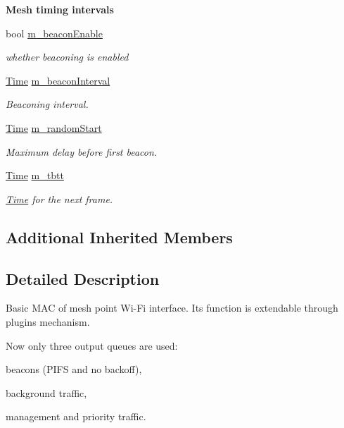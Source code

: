 \begin{Indent}{\bf Mesh timing intervals}\par
\begin{DoxyCompactItemize}
\item 
bool \hyperlink{classns3_1_1MeshWifiInterfaceMac_ab9019c324f1c01c06ce13bc137691c39}{m\+\_\+beacon\+Enable}
\begin{DoxyCompactList}\small\item\em whether beaconing is enabled \end{DoxyCompactList}\item 
\hyperlink{classns3_1_1Time}{Time} \hyperlink{classns3_1_1MeshWifiInterfaceMac_a106e67903abbdb360b51ce457b6d315b}{m\+\_\+beacon\+Interval}
\begin{DoxyCompactList}\small\item\em Beaconing interval. \end{DoxyCompactList}\item 
\hyperlink{classns3_1_1Time}{Time} \hyperlink{classns3_1_1MeshWifiInterfaceMac_ac5bcacc9a26b26fade1fd72e980ebd68}{m\+\_\+random\+Start}
\begin{DoxyCompactList}\small\item\em Maximum delay before first beacon. \end{DoxyCompactList}\item 
\hyperlink{classns3_1_1Time}{Time} \hyperlink{classns3_1_1MeshWifiInterfaceMac_af979a6faf2261a0bde9ebb5cdcb15450}{m\+\_\+tbtt}
\begin{DoxyCompactList}\small\item\em \hyperlink{classns3_1_1Time}{Time} for the next frame. \end{DoxyCompactList}\end{DoxyCompactItemize}
\end{Indent}
\subsection*{Additional Inherited Members}


\subsection{Detailed Description}
Basic M\+AC of mesh point Wi-\/\+Fi interface. Its function is extendable through plugins mechanism. 

Now only three output queues are used\+:
\begin{DoxyItemize}
\item beacons (P\+I\+FS and no backoff),
\item background traffic,
\item management and priority traffic. 
\end{DoxyItemize}

